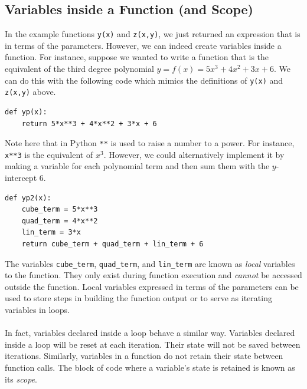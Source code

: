 \documentclass{article}
\begin{document}
\subsection{Variables inside a Function (and Scope)}
In the example functions \texttt{y(x)} and \texttt{z(x,y)}, we just returned an expression that is in terms of the parameters. However, we can indeed create variables inside a function. For instance, suppose we wanted to write a function that is the equivalent of the third degree polynomial $y = f(x)=5x^3 + 4x^2 + 3x + 6$. We can do this with the following code which mimics the definitions of \texttt{y(x)} and \texttt{z(x,y)} above.
\begin{verbatim}
def yp(x):
    return 5*x**3 + 4*x**2 + 3*x + 6
\end{verbatim}
Note here that in Python \texttt{**} is used to raise a number to a power. For instance, \texttt{x**3} is the equivalent of $x^3$. However, we could alternatively implement it by making a variable for each polynomial term and then sum them with the $y$-intercept 6.
\begin{verbatim}
def yp2(x):
    cube_term = 5*x**3
    quad_term = 4*x**2
    lin_term = 3*x
    return cube_term + quad_term + lin_term + 6
\end{verbatim}
The variables \texttt{cube\_term}, \texttt{quad\_term}, and \texttt{lin\_term} are known as \textit{local} variables to the function. They only exist during function execution and \textit{cannot} be accessed outside the function. Local variables expressed in terms of the parameters can be used to store steps in building the function output or to serve as iterating variables in loops.\\\\
In fact, variables declared inside a loop behave a similar way. Variables declared inside a loop will be reset at each iteration. Their state will not be saved between iterations. Similarly, variables in a function do not retain their state between function calls. The block of code where a variable's state is retained is known as its \textit{scope}.
\end{document}
